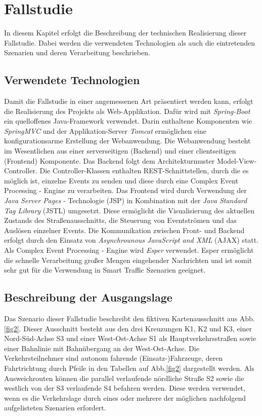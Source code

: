 \section{Fallstudie}
In diesem Kapitel erfolgt die Beschreibung der technischen Realisierung dieser Fallstudie. Dabei werden die verwendeten Technologien als auch die eintretenden Szenarien und deren Verarbeitung beschrieben.

\subsection{Verwendete Technologien}
Damit die Fallstudie in einer angemessenen Art präsentiert werden kann, erfolgt die Realisierung des Projekts als Web-Applikation. Dafür wird mit \textit{Spring-Boot} ein quelloffenes Java-Framework verwendet. Darin enthaltene Komponenten wie \textit{SpringMVC} und der Applikation-Server \textit{Tomcat} ermöglichen eine konfigurationsarme Erstellung der Webanwendung. Die Webanwendung besteht im Wesentlichen aus einer serverseitigen (Backend) und einer clientseitigen (Frontend) Komponente. \linebreak
Das Backend folgt dem Architekturmuster Model-View-Controller. Die Controller-Klassen enthalten REST-Schnittstellen, durch die es möglich ist, einzelne Events zu senden und diese durch eine Complex Event Processing - Engine zu verarbeiten.\linebreak 
Das Frontend wird durch Verwendung der \textit{Java Server Pages} - Technologie (JSP) in Kombination mit der \textit{Java Standard Tag Library} (JSTL) umgesetzt. Diese ermöglicht die Visualisierung des aktuellen Zustands des Straßenausschnitts, die Steuerung von Eventströmen und das Auslösen einzelner Events. Die Kommunikation zwischen Front- und Backend erfolgt durch den Einsatz von \textit{Asynchrounous JavaScript and XML} (AJAX) statt. \linebreak
Als Complex Event Processing - Engine wird \textit{Esper} verwendet. Esper ermöglicht die schnelle Verarbeitung großer Mengen eingehender Nachrichten und ist somit sehr gut für die Verwendung in Smart Traffic Szenarien geeignet. 

\subsection{Beschreibung der Ausgangslage}
Das Szenario dieser Fallstudie beschreibt den fiktiven Kartenausschnitt aus Abb.\ref{fig2}. Dieser Ausschnitt besteht aus den drei Kreuzungen K1, K2 und K3, einer Nord-Süd-Achse S3 und einer West-Ost-Achse S1 als Hauptverkehrsstraßen sowie einer Bahnlinie mit Bahnübergang an der West-Ost-Achse. Die Verkehrsteilnehmer sind autonom fahrende (Einsatz-)Fahrzeuge, deren Fahrtrichtung durch Pfeile in den Tabellen auf Abb.\ref{fig2} dargestellt werden. Als Ausweichrouten können die parallel verlaufende nördliche Straße S2 sowie die westlich von der S3 verlaufende S4 befahren werden. Diese werden verwendet, wenn es die Verkehrslage durch eines oder mehrere der möglichen nachfolgend aufgelisteten Szenarien erfordert.

